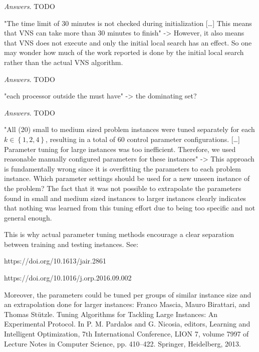 \documentclass [11pt]{scrartcl}
\begin{document}
\emph{Answers}. TODO 

\begin{leftbar}
"The time limit of 30 minutes is not checked during initialization […] This means that VNS can take more than 30 minutes to finish"
-> However, it also means that VNS does not execute and only the initial local search has an effect. So one may wonder how much of the work reported is done by the initial local search rather than the actual VNS algorithm.
\end{leftbar}

\emph{Answers}. TODO 

\begin{leftbar}
"each processor outside the must have" -> the dominating set?
\end{leftbar}

\emph{Answers}. TODO 

\begin{leftbar}
"All (20) small to medium sized problem instances were tuned separately for each $k\in\left\lbrace 1, 2, 4\right\rbrace $, resulting in a total of 60 control parameter configurations. […] Parameter tuning for large instances was too inefficient. Therefore, we used reasonable manually configured parameters for these
instances"
-> This approach is fundamentally wrong since it is overfitting the parameters to each problem instance. Which parameter settings should be used for a new unseen instance of the problem? The fact that it was not possible to extrapolate the parameters found in small and medium sized instances to larger instances clearly indicates that nothing was learned from this tuning effort due to being too specific and not general enough.

This is why actual parameter tuning methods encourage a clear separation between training and testing instances. See:

https://doi.org/10.1613/jair.2861

https://doi.org/10.1016/j.orp.2016.09.002

Moreover, the parameters could be tuned per groups of similar instance size and an extrapolation done for larger instances: Franco Mascia, Mauro Birattari, and Thomas Stützle. Tuning Algorithms for Tackling Large Instances: An Experimental Protocol. In P. M. Pardalos and G. Nicosia, editors, Learning and Intelligent Optimization, 7th International Conference, LION 7, volume 7997 of Lecture Notes in Computer Science, pp. 410–422. Springer, Heidelberg, 2013.	
\end{leftbar}
\end{document}
